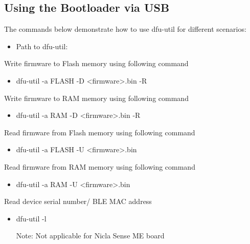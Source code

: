 \documentclass{article}
\begin{document}
\subsection{Using the Bootloader via USB}
The commands below demonstrate how to use dfu-util for different scenarios:

\begin{itemize}
	\item Path to dfu-util: 
\end{itemize}

Write firmware to Flash memory using following command
\begin{itemize}
	\item dfu-util -a FLASH -D <firmware>.bin -R
\end{itemize}

Write firmware to RAM memory using following command
\begin{itemize}
	\item dfu-util -a RAM -D <firmware>.bin -R
\end{itemize}

Read firmware from Flash memory using following command
\begin{itemize}
	\item dfu-util -a FLASH -U <firmware>.bin
\end{itemize}

Read firmware from RAM memory using following command
\begin{itemize}
	\item dfu-util -a RAM -U <firmware>.bin
\end{itemize}

Read device serial number/ BLE MAC address
\begin{itemize}
	\item dfu-util -l
	
Note: Not applicable for Nicla Sense ME board
\end{itemize}
\end{document}
